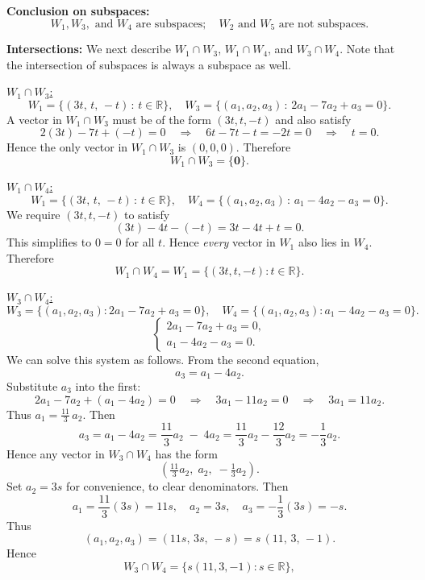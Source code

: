 \documentclass{article}
\begin{document}
\noindent
\textbf{Conclusion on subspaces:}
\[
W_1, W_3, \text{ and } W_4 \text{ are subspaces}; \quad W_2 \text{ and } W_5 \text{ are not subspaces.}
\]

\bigskip

\noindent
\textbf{Intersections:} We next describe $W_1\cap W_3$, $W_1\cap W_4$, and $W_3\cap W_4$. Note that the intersection of subspaces is always a subspace as well.

\medskip
\noindent
\underline{$W_1 \cap W_3$:}
\[
W_1 = \{(3t,\, t,\, -t)\,:\, t\in \mathbb{R}\}, 
\quad
W_3 = \{(a_1,a_2,a_3)\,:\, 2a_1 -7a_2 + a_3 = 0\}.
\]
A vector in $W_1 \cap W_3$ must be of the form $(3t, t, -t)$ and also satisfy
\[
2(3t) - 7t + (-t) = 0
\quad \Longrightarrow \quad 6t - 7t - t = -2t = 0
\quad \Longrightarrow \quad t=0.
\]
Hence the only vector in $W_1 \cap W_3$ is $(0,0,0)$. Therefore
\[
\boxed{W_1 \cap W_3 = \{\mathbf{0}\}.}
\]

\medskip
\noindent
\underline{$W_1 \cap W_4$:}
\[
W_1 = \{(3t,\, t,\, -t)\,:\, t\in \mathbb{R}\}, 
\quad
W_4 = \{(a_1,a_2,a_3)\,:\, a_1 -4a_2 - a_3 = 0\}.
\]
We require $(3t, t, -t)$ to satisfy
\[
(3t) - 4t - (-t) = 3t - 4t + t = 0.
\]
This simplifies to $0=0$ for all $t$. Hence \emph{every} vector in $W_1$ also lies in $W_4$. Therefore
\[
\boxed{W_1 \cap W_4 = W_1 = \{(3t, t, -t) : t \in \mathbb{R}\}.}
\]

\medskip
\noindent
\underline{$W_3 \cap W_4$:}
\[
W_3 = \{(a_1,a_2,a_3) : 2a_1 - 7a_2 + a_3 = 0\}, 
\quad
W_4 = \{(a_1,a_2,a_3) : a_1 - 4a_2 - a_3 = 0\}.
\]
\[
\begin{cases}
2a_1 - 7a_2 + a_3 = 0,\\
a_1 - 4a_2 - a_3 = 0.
\end{cases}
\]
We can solve this system as follows. From the second equation,
\[
a_3 = a_1 - 4a_2.
\]
Substitute $a_3$ into the first:
\[
2a_1 - 7a_2 + (a_1 - 4a_2) = 0 
\quad \Longrightarrow \quad 3a_1 - 11a_2 = 0 
\quad \Longrightarrow \quad 3a_1 = 11a_2.
\]
Thus $a_1 = \tfrac{11}{3}\,a_2$. Then
\[
a_3 = a_1 - 4a_2 = \frac{11}{3}a_2 \;-\; 4a_2 
= \frac{11}{3}a_2 - \frac{12}{3}a_2 
= -\frac{1}{3}a_2.
\]
Hence any vector in $W_3 \cap W_4$ has the form
\[
\left(\tfrac{11}{3}a_2,\; a_2,\; -\tfrac{1}{3}a_2\right).
\]
Set $a_2 = 3s$ for convenience, to clear denominators. Then
\[
a_1 = \frac{11}{3}(3s) = 11s,\quad
a_2 = 3s,\quad
a_3 = -\frac{1}{3}(3s) = -s.
\]
Thus
\[
(a_1, a_2, a_3) = (11s,\,3s,\,-s) = s\,(11,\,3,\,-1).
\]
Hence
\[
\boxed{W_3 \cap W_4 = \{ s(11,3,-1) : s \in \mathbb{R}\},
}
\]

\bigskip
\end{document}
